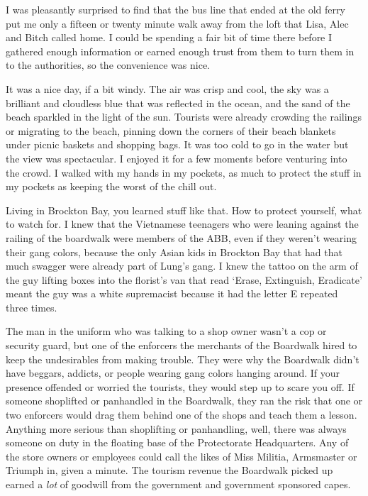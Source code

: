 





I was pleasantly surprised to find that the bus line that ended at the old ferry put me only a fifteen or twenty minute walk away from the loft that Lisa, Alec and Bitch called home.  I could be spending a fair bit of time there before I gathered enough information or earned enough trust from them to turn them in to the authorities, so the convenience was nice.



It was a nice day, if a bit windy.  The air was crisp and cool, the sky was a brilliant and cloudless blue that was reflected in the ocean, and the sand of the beach sparkled in the light of the sun.  Tourists were already crowding the railings or migrating to the beach, pinning down the corners of their beach blankets under picnic baskets and shopping bags.  It was too cold to go in the water but the view was spectacular.  I enjoyed it for a few moments before venturing into the crowd.  I walked with my hands in my pockets, as much to protect the stuff in my pockets as keeping the worst of the chill out.



Living in Brockton Bay, you learned stuff like that.  How to protect yourself, what to watch for.  I knew that the Vietnamese teenagers who were leaning against the railing of the boardwalk were members of the ABB, even if they weren't wearing their gang colors, because the only Asian kids in Brockton Bay that had that much swagger were already part of Lung's gang.  I knew the tattoo on the arm of the guy lifting boxes into the florist's van that read `Erase, Extinguish, Eradicate' meant the guy was a white supremacist because it had the letter E repeated three times.



The man in the uniform who was talking to a shop owner wasn't a cop or security guard, but one of the enforcers the merchants of the Boardwalk hired to keep the undesirables from making trouble.  They were why the Boardwalk didn't have beggars, addicts, or people wearing gang colors hanging around.  If your presence offended or worried the tourists, they would step up to scare you off.  If someone shoplifted or panhandled in the Boardwalk, they ran the risk that one or two enforcers would drag them behind one of the shops and teach them a lesson.  Anything more serious than shoplifting or panhandling, well, there was always someone on duty in the floating base of the Protectorate Headquarters.  Any of the store owners or employees could call the likes of Miss Militia, Armsmaster or Triumph in, given a minute.  The tourism revenue the Boardwalk picked up earned a \emph{lot} of goodwill from the government and government sponsored capes.



